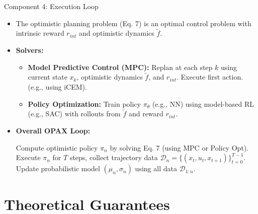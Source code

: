 \documentclass[11pt,aspectratio=169]{beamer}
\DeclareMathOperator*{\argmax}{arg\,max}
\begin{document}
\begin{frame}{Component 4: Execution Loop}
    \begin{itemize}
        \item The optimistic planning problem (Eq. 7) is an optimal control problem with intrinsic reward $r_{int}$ and optimistic dynamics $\tilde{f}$.
        \item \textbf{Solvers:}
        \begin{itemize}
            \item \textbf{Model Predictive Control (MPC):} Replan at each step $k$ using current state $x_k$, optimistic dynamics $\tilde{f}$, and $r_{int}$. Execute first action. (e.g., using iCEM).
            \item \textbf{Policy Optimization:} Train policy $\pi_\theta$ (e.g., NN) using model-based RL (e.g., SAC) with rollouts from $\tilde{f}$ and reward $r_{int}$.
        \end{itemize}
        \pause
        \item \textbf{Overall OPAX Loop:}
        \begin{algorithmic}[1] %
                \State Compute optimistic policy $\pi_n$ by solving Eq. 7 (using MPC or Policy Opt).
                \State Execute $\pi_n$ for $T$ steps, collect trajectory data $\mathcal{D}_n = \{ (x_t, u_t, x_{t+1}) \}_{t=0}^{T-1}$.
                \State Update probabilistic model $(\mu_n, \sigma_n)$ using all data $\mathcal{D}_{1:n}$.
            \EndFor
        \end{algorithmic}
    \end{itemize}
\end{frame}

\section{Theoretical Guarantees}



\end{document}
